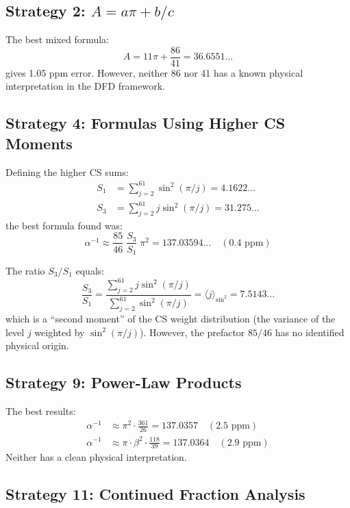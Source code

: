 \documentclass[11pt,a4paper]{article}
\theoremstyle{definition}
\begin{document}
\subsection{Strategy 2: $A = a\pi + b/c$}

The best mixed formula:
\begin{equation}
A = 11\pi + \frac{86}{41} = 36.6551\ldots
\end{equation}
gives 1.05 ppm error.  However, neither 86 nor 41 has a known physical
interpretation in the DFD framework.

\subsection{Strategy 4: Formulas Using Higher CS Moments}

Defining the higher CS sums:
\begin{align}
S_1 &= \sum_{j=2}^{61}\sin^2(\pi/j) = 4.1622\ldots \\
S_3 &= \sum_{j=2}^{61} j\sin^2(\pi/j) = 31.275\ldots
\end{align}
the best formula found was:
\begin{equation}
\alpha^{-1} \approx \frac{85}{46}\;\frac{S_3}{S_1}\;\pi^2
= 137.03594\ldots \quad (0.4\text{ ppm})
\end{equation}

The ratio $S_3/S_1$ equals:
\begin{equation}
\frac{S_3}{S_1} = \frac{\sum_{j=2}^{61} j\sin^2(\pi/j)}
                       {\sum_{j=2}^{61}\sin^2(\pi/j)}
= \langle j \rangle_{\sin^2}
= 7.5143\ldots
\end{equation}
which is a ``second moment'' of the CS weight distribution (the variance
of the level $j$ weighted by $\sin^2(\pi/j)$).  However, the prefactor
$85/46$ has no identified physical origin.

\subsection{Strategy 9: Power-Law Products}

The best results:
\begin{align}
\alpha^{-1} &\approx \pi^2 \cdot \frac{361}{26} = 137.0357
\quad (2.5\text{ ppm}) \\
\alpha^{-1} &\approx \pi \cdot \beta^2 \cdot \frac{118}{39} = 137.0364
\quad (2.9\text{ ppm})
\end{align}
Neither has a clean physical interpretation.

\subsection{Strategy 11: Continued Fraction Analysis}
\end{document}
